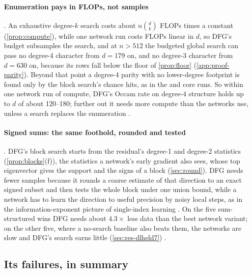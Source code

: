\paragraph{Enumeration pays in FLOPs, not samples} . An exhaustive degree-$k$ search costs about $n\binom dk$ FLOPs times a constant (\cref{prop:compute}), while one network run costs FLOPs linear in $d$, so DFG's budget subsamples the search, and at $n>512$ the budgeted global search can pass no degree-4 character from $d=179$ on, and no degree-3 character from $d=630$ on, because its rows fall below the floor of \cref{prop:floor} (\cref{app:proof-parity}). Beyond that point a degree-4 parity with no lower-degree footprint is found only by the block search's chance hits, as in the  and core runs. So within one network run of compute, DFG's Occam rate on degree-4 structure holds up to $d$ of about 120--180; further out it needs more compute than the networks use, unless a search replaces the enumeration .

\paragraph{Signed sums: the same foothold, rounded and tested} . DFG's block search starts from the residual's degree-1 and degree-2 statistics (\cref{prop:blocks}(f)), the statistics a network's early gradient also sees, whose top eigenvector gives the support and the signs of a block (\cref{sec:round}). DFG needs fewer samples because it rounds a coarse estimate of that direction to an exact signed subset and then tests the whole block under one union bound, while a network has to learn the direction to useful precision by noisy local steps, as in the information-exponent picture of single-index learning \cite{benarous2021online,damian2024gaps}. On the five sum-structured  wins DFG needs about $4.3\times$ less data than the best network variant; on the other five, where a no-search baseline also beats them, the networks are slow and DFG's search earns little (\cref{sec:res-dlheld7}) .

\subsection{Its failures, in summary}\label{sec:disc-fail}

